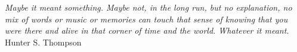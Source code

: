\clearpage

\narrowlinespacing


\vspace*{7cm}
\begin{myquote}
\begin{flushright}
\textit{Maybe it meant something. Maybe not, in the long run, but no explanation, no mix of words
or music or memories can touch that sense of knowing that you were there and alive in that
corner of time and the world. Whatever it meant.} \\Hunter S. Thompson
\end{flushright}
\end{myquote}



\normallinespacing